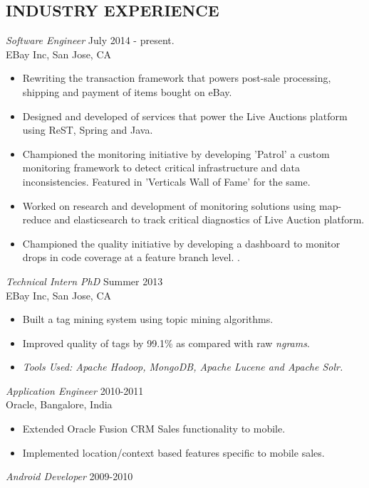 \documentclass[line,margin]{res}
\begin{document}
\begin{resume}
		\section{INDUSTRY EXPERIENCE} 
		{\sl Software Engineer} \hfill July 2014 - present.\\
		EBay Inc, San Jose, CA
		\begin{itemize}  \itemsep -2pt %
			\item Rewriting the transaction framework that powers post-sale processing, shipping and payment of items bought on eBay.
			\item Designed and developed of services that power the Live Auctions platform using ReST, Spring and Java.
			\item Championed the monitoring initiative by developing 'Patrol' a custom monitoring framework to detect critical infrastructure and data inconsistencies. Featured in 'Verticals Wall of Fame' for the same.
			\item Worked on research and development of monitoring solutions using map-reduce and elasticsearch to track critical diagnostics of Live Auction platform. 
			\item Championed the quality initiative by developing a dashboard to monitor drops in code coverage at a feature branch level. .
		\end{itemize}
		{\sl Technical Intern PhD} \hfill Summer 2013\\
		EBay Inc, San Jose, CA
		\begin{itemize}  \itemsep -2pt %
			\item Built a tag mining system using topic mining algorithms.
			\item Improved quality of tags by 99.1\% as compared with raw \emph{ngrams}.
			\item \emph{Tools Used: Apache Hadoop, MongoDB, Apache Lucene and Apache Solr.}
		\end{itemize}
		{\sl Application Engineer} \hfill 2010-2011 \\
		Oracle, 
		Bangalore, India
		\begin{itemize}  \itemsep -2pt %
			\item Extended Oracle Fusion CRM Sales functionality to mobile.
			\item Implemented location/context based features specific to mobile sales.
		\end{itemize}
		{\sl Android Developer} \hfill            2009-2010 \\

\end{resume}
\end{document}
